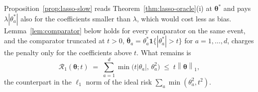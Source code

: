 \documentclass[10pt]{book}
\theoremstyle{definition}
\newcommand{\norm}[1]{\left\lVert #1 \right\rVert}
\newcommand{\btheta}{\boldsymbol{\theta}}
\newcommand{\thetastar}{\btheta^{*}}
\newcommand{\pen}{\lambda}
\newcommand{\thbar}{\bar{\btheta}}
\newcommand{\Rone}{\mathcal{R}_{1}}
\begin{document}
{%
Proposition~\ref{prop:lasso-slow} reads Theorem~\ref{thm:lasso-oracle}(i) at
$\thetastar$ and pays $\pen|\theta^{*}_{a}|$ also for the coefficients
smaller than $\pen$, which would cost less as bias. Lemma~\ref{lem:comparator}
below holds for every comparator on the same event, and the comparator
truncated at $t > 0$,
$\thbar_{a} = \theta^{*}_{a}\mathbf{1}\{|\theta^{*}_{a}| > t\}$ for
$a = 1,\dots,d$, charges the penalty only for the coefficients above $t$. What
remains is
\begin{equation}
  \label{eq:R1}
  \Rone(\btheta;t) \;=\; \sum_{a=1}^{d}\min\bigl(t|\theta_{a}|,\,\theta_{a}^{2}\bigr)
  \;\le\; t\norm{\btheta}_{1},
\end{equation}
the counterpart in the $\ell_1$ norm of the ideal risk
$\sum_{a}\min(\theta_{a}^{2},t^{2})$.

}
\end{document}
